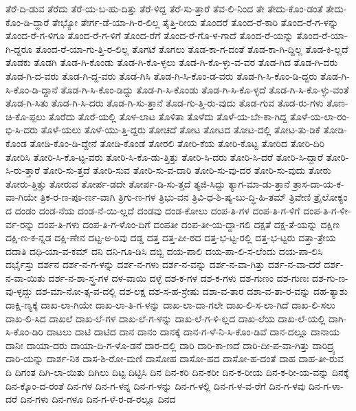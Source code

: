 {ತೆರೆ-ದಿ-ಡುವ
ತೆರೆದು
ತೆರೆ-ಯ-ಬ-ಹು-ದಿತ್ತು
ತೆರೆ-ಳಿದ್ದ
ತೆರೆ-ಸು-ತ್ತಾರೆ
ತೆವ-ಲಿ-ನಿಂದ
ತೇ
ತೇದು-ಕೊಂ-ಡಂತೆ
ತೇದು-ಕೊಂ-ಡಿ-ದ್ದಾರೆ
ತೇಭ್ಯೋ
ತೇರ್ಗ-ಡೆ-ಯಾ-ಗಿ-ರ-ಲಿಲ್ಲ
ತೈತ್ತಿ-ರೀಯ
ತೊಂದರೆ
ತೊಂದ-ರೆ-ಕಾರಿ
ತೊಂದ-ರೆ-ಗ-ಳನ್ನು
ತೊಂದ-ರೆ-ಗ-ಳಿಗೂ
ತೊಂದ-ರೆ-ಗ-ಳಿಗೆ
ತೊಂದ-ರೆಗೆ
ತೊಂದ-ರೆ-ಗೊ-ಳ-ಗಾದೆ
ತೊಂದ-ರೆ-ಯನ್ನು
ತೊಂದ-ರೆ-ಯಾ-ಗಿ-ದ್ದರೂ
ತೊಂದ-ರೆ-ಯಾ-ಗು-ತ್ತಿ-ರ-ಲಿಲ್ಲ
ತೊಗಟೆ
ತೊಗಲು
ತೊಡ-ಕಾ-ಗ-ದಂತೆ
ತೊಡ-ಕಾ-ಗಿ-ದ್ದಿಲ್ಲ
ತೊಡ-ಕಿ-ಲ್ಲದೆ
ತೊಡಕು
ತೊಡಗಿ
ತೊಡ-ಗಿ-ಕೊಂಡು
ತೊಡ-ಗಿ-ಕೊ-ಳ್ಳಲು
ತೊಡ-ಗಿ-ಕೊ-ಳ್ಳು-ವ-ವರ
ತೊಡ-ಗಿದ
ತೊಡ-ಗಿ-ದರು
ತೊಡ-ಗಿ-ದ-ವರು
ತೊಡ-ಗಿ-ದ್ದ-ವರು
ತೊಡ-ಗಿಸಿ
ತೊಡ-ಗಿ-ಸಿ-ಕೊಂ-ಡ-ವರು
ತೊಡ-ಗಿ-ಸಿ-ಕೊಂ-ಡಿ-ದ್ದರು
ತೊಡ-ಗಿ-ಸಿ-ಕೊಂ-ಡಿ-ದ್ದಾನೆ
ತೊಡ-ಗಿ-ಸಿ-ಕೊಂ-ಡಿದ್ದು
ತೊಡ-ಗಿ-ಸಿ-ಕೊಂಡು
ತೊಡ-ಗಿ-ಸಿ-ಕೊ-ಳ್ಳದೆ
ತೊಡ-ಗಿ-ಸಿ-ಕೊ-ಳ್ಳು-ವಂತೆ
ತೊಡ-ಗಿ-ಸಿತು
ತೊಡ-ಗಿ-ಸಿ-ದರು
ತೊಡ-ಗಿ-ಸು-ತ್ತಾನೆ
ತೊಡ-ಗು-ತ್ತಿ-ರು-ವುದು
ತೊಡ-ಗುವ
ತೊಡ-ರು-ಗಳು
ತೊಣ-ಚಿ-ಕೊ-ಪ್ಪಲು
ತೊರೆದು
ತೊರೆ-ಯಲ್ಲಿ
ತೊಳ-ಲಾಟ
ತೊಳಿತಾ
ತೊಳೆದು
ತೊಳೆ-ಯ-ಬೇ-ಕಾ-ಗಿದ್ದ
ತೊಳೆ-ಯ-ಲಾ-ರಂ-ಭಿ-ಸಿ-ದರು
ತೊಳೆ-ಯಲು
ತೊಳೆ-ಯು-ತ್ತಿ-ದ್ದರು
ತೋಚದೆ
ತೋಟ
ತೋಟದ
ತೋಟ-ದಲ್ಲಿ
ತೋಟ-ತು-ಡಿಕೆ
ತೋಡಿ-ಕೊಂಡ
ತೋಡಿ-ಕೊಂ-ಡಿ-ದ್ದೇನೆ
ತೋಡಿ-ಕೊಂಡೆ
ತೋರಲಿ
ತೋರಿ-ಕೆಯ
ತೋರಿ-ಕೊಟ್ಟ
ತೋರಿದ
ತೋರಿ-ದಿರಿ
ತೋರಿಸಿ
ತೋರಿ-ಸಿ-ಕೊ-ಟ್ಟ-ವರು
ತೋರಿ-ಸಿ-ಕೊ-ಡು-ತ್ತಿತ್ತು
ತೋರಿ-ಸಿ-ದರು
ತೋರಿ-ಸಿ-ದರೆ
ತೋರಿ-ಸಿ-ದ್ದಾರೆ
ತೋರಿ-ಸಿ-ರು-ತ್ತಾರೆ
ತೋರಿ-ಸು-ತ್ತದೆ
ತೋರಿ-ಸುವ
ತೋರಿ-ಸು-ವ-ದಾರಿ
ತೋರಿ-ಸು-ವು-ದರ
ತೋರಿ-ಸು-ವುದು
ತೋರು
ತೋರು-ತ್ತಿತ್ತು
ತೋರುವ
ತೋರ್ಪ-ಡದೇ
ತೋರ್ಪ-ಡಿ-ಸು-ತ್ತದೆ
ತ್ಯಜಿ-ಸಿದ್ದು
ತ್ಯಾಗ-ಮಾ-ಡು-ತ್ತಾನೆ
ತ್ರಾಸ-ದಾ-ಯ-ಕ-ವಾ-ಗಿಯೇ
ತ್ರಿಕ-ರ-ಣ-ಪೂ-ರ್ಣ-ವಾಗಿ
ತ್ರಿಗು-ಣ-ಗಳ
ತ್ರಿಭು-ವನ
ತ್ರಿವಿ-ಧ-ಶಿ-ಷ್ಯ-ಬು-ದ್ಧಿ-ಹಿ-ತಮ್
ತ್ರಿವೇಣಿ
ತ್ರೈಲೋಕ್ಯಂ
ದ
ದಂಡಂ
ದಂಡ-ನೆಯ
ದಂಡ-ನೆ-ಯಿ-ಲ್ಲದೆ
ದಂಡವು
ದಂಡ-ಕೋಲು
ದಂಪ-ತಿ-ಗಳ
ದಂಪ-ತಿ-ಗ-ಳಿಗೆ
ದಂಪ-ತಿ-ಗ-ಳೀ-ರ್ವ-ರನ್ನು
ದಂಪ-ತಿ-ಗಳು
ದಂಪ-ತಿ-ಗ-ಳೊಂ-ದಿಗೆ
ದಂಪತೀ
ದಂಪ-ತೀ-ಯ-ದ್ದಾ-ಗಲಿ
ದಕ್ಷತೆ
ದಕ್ಷ-ತೆ-ಯನ್ನು
ದಕ್ಷಿಣ
ದಕ್ಷಿ-ಣ-ಕ-ನ್ನಡ
ದಕ್ಷಿ-ಣೇನ
ದಟ್ಟ-ಅ-ರಿವು
ದಡ್ಡ
ದತ್ತ
ದತ್ತ-ಪೀ-ಠದ
ದತ್ತ-ಭ-ಟ್ಟ-ರಲ್ಲಿ
ದತ್ತ-ಭ-ಟ್ಟರು
ದತ್ತಾ-ತ್ರೇಯ
ದದಾತಿ
ದಧಿ-ಯಾ-ವ-ಕಮ್
ದನಿ
ದನಿ-ಗೂ-ಡಿಸಿ
ದಬ್ಬಿ
ದಯ-ಪಾಲಿ
ದಯ-ಪಾ-ಲಿ-ಸ-ಲೆಂದು
ದಯ-ಪಾ-ಲಿಸಿ
ದರ್ಭೈಸ್ತು
ದರ್ಶನ
ದರ್ಶ-ನ-ಗ-ಳನ್ನು
ದರ್ಶ-ನ-ಗಳು
ದರ್ಶ-ನ-ವನ್ನು
ದರ್ಶ-ನ-ವಾ-ಗಿತ್ತು
ದರ್ಶ-ನ-ವಾ-ದರೆ
ದರ್ಶ-ನ-ವಾ-ಯಿತು
ದರ್ಶ-ನ-ಶಾ-ಸ್ತ್ರ-ಗಳ
ದಳ-ವಾಯಿ
ದಳ್ಳೆ
ದಶ-ಕ-ಗಳ
ದಶ-ಕ-ಗಳು
ದಶ-ಗುಣಂ
ದಶ-ಗುಣಃ
ದಶ-ಗು-ಣ-ವು-ಳ್ಳದ್ದು
ದಶ-ಮಾ-ನೋ-ತ್ಸ-ವ-ದಲ್ಲಿ
ದಶ-ಲಕ್ಷ
ದಶ-ಸ-ಹ-ಸ್ರೇಷು
ದಶಾ-ವ-ತಾರ
ದಶಾ-ವ-ತಾ-ರ-ವನ್ನು
ದಹ-ತ್ಯಾಶು
ದಾಕ್ಷಿ-ಣ್ಯಕ್ಕೆ
ದಾಖ-ಲಾ-ಗಿಯೇ
ದಾಖ-ಲಾ-ತಿ-ಗ-ಳನ್ನು
ದಾಖ-ಲಾ-ದಾ-ಗಲೇ
ದಾಖ-ಲಿ-ಸ-ಲಾ-ಗಿದೆ
ದಾಖ-ಲಿ-ಸಲು
ದಾಖ-ಲಿ-ಸಿದ
ದಾಖಲೆ
ದಾಖ-ಲೆ-ಗಳ
ದಾಖ-ಲೆ-ಗ-ಳನ್ನು
ದಾಖ-ಲೆ-ಗ-ಳಿ-ಲ್ಲದ
ದಾಖ-ಲೆಯ
ದಾಖ-ಲೆ-ಯಲ್ಲಿ
ದಾಗಿ-ಸಿ-ಕೊಂ-ಡಿರಿ
ದಾಟಲು
ದಾಟಿ
ದಾಟಿದ
ದಾನ
ದಾನಂ
ದಾನಕ್ಕೆ
ದಾನ-ಗ-ಳೆ-ನಿ-ಸಿ-ಕೊಂ-ಡಿವೆ
ದಾನ-ದಲ್ಲೂ
ದಾನಾಯ
ದಾನೀ
ದಾಯಾ-ದರು
ದಾಯಾ-ದಿ-ಗ-ಳೊ-ಡನೆ
ದಾರ-ದಲ್ಲಿ
ದಾರಿ
ದಾರಿ-ಕಾ-ಣದೆ
ದಾರಿ-ದೀ-ಪ-ವಾ-ಗಿತ್ತು
ದಾರಿದ್ರ್ಯ
ದಾರಿ-ಯನ್ನು
ದಾರ್ಶ-ನಿಕ
ದಾಸ-ಶಿ-ರೋ-ಮಣಿ
ದಾಸೋಹ
ದಾಸೋ-ಹದ
ದಾಸೋ-ಹ-ದಂತೆ
ದಾಹ
ದಾಹ-ತೀ-ರುವ
ದಿ
ದಿಗಂತ
ದಿಗಿ-ಲಾ-ಯಿತು
ದಿಗಿಲು
ದಿಟ್ಟ
ದಿಟ್ಟಿಸಿ
ದಿನ
ದಿನ-ಕರಿ
ದಿನ-ಕರೀ
ದಿನ-ಕ-ರೀಯ
ದಿನ-ಕ-ರೀ-ಯ-ವನ್ನು
ದಿನಕ್ಕೆ
ದಿನ-ಕ್ಕೊಂ-ದ-ರಂತೆ
ದಿನ-ಗಳ
ದಿನ-ಗ-ಳನ್ನ
ದಿನ-ಗ-ಳನ್ನು
ದಿನ-ಗ-ಳಲ್ಲಿ
ದಿನ-ಗ-ಳ-ವ-ರೆಗೆ
ದಿನ-ಗ-ಳವು
ದಿನ-ಗ-ಳಾ-ದರೆ
ದಿನ-ಗಳು
ದಿನ-ಗಳೂ
ದಿನ-ಗ-ಳೆ-ರ-ಡ-ರಲ್ಲೂ
ದಿನದ
}
